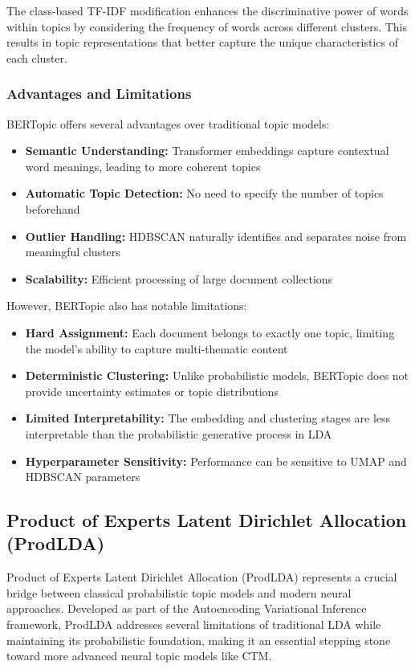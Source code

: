 \documentclass[12pt]{article}
\begin{document}
The class-based TF-IDF modification enhances the discriminative power of words
within topics by considering the frequency of words across different clusters.
This results in topic representations that better capture the unique
characteristics of each cluster.

\subsubsection{Advantages and Limitations}
BERTopic offers several advantages over traditional topic models:
\begin{itemize}
    \item \textbf{Semantic Understanding:} Transformer embeddings capture contextual word meanings, leading to more coherent topics
    \item \textbf{Automatic Topic Detection:} No need to specify the number of topics beforehand
    \item \textbf{Outlier Handling:} HDBSCAN naturally identifies and separates noise from meaningful clusters
    \item \textbf{Scalability:} Efficient processing of large document collections
\end{itemize}

However, BERTopic also has notable limitations:
\begin{itemize}
    \item \textbf{Hard Assignment:} Each document belongs to exactly one topic, limiting the model's ability to capture multi-thematic content
    \item \textbf{Deterministic Clustering:} Unlike probabilistic models, BERTopic does not provide uncertainty estimates or topic distributions
    \item \textbf{Limited Interpretability:} The embedding and clustering stages are less interpretable than the probabilistic generative process in LDA
    \item \textbf{Hyperparameter Sensitivity:} Performance can be sensitive to UMAP and HDBSCAN parameters
\end{itemize}

\subsection{Product of Experts Latent Dirichlet Allocation (ProdLDA)}
Product of Experts Latent Dirichlet Allocation (ProdLDA)
\cite{srivastava2017autoencoding} represents a crucial bridge between classical
probabilistic topic models and modern neural approaches. Developed as part of
the Autoencoding Variational Inference framework, ProdLDA addresses several
limitations of traditional LDA while maintaining its probabilistic foundation,
making it an essential stepping stone toward more advanced neural topic models
like CTM.
\end{document}
